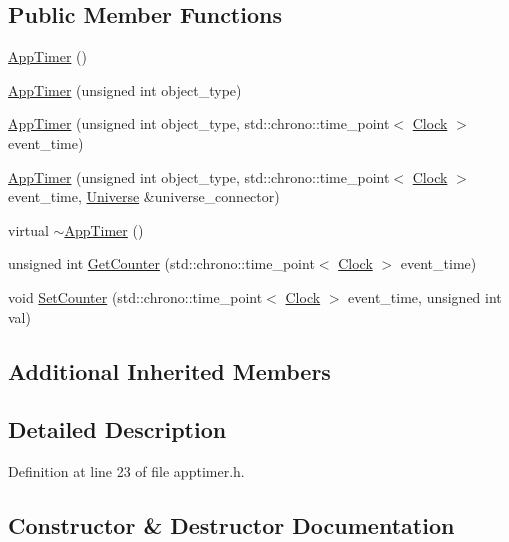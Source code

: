 \subsection*{Public Member Functions}
\begin{DoxyCompactItemize}
\item 
\hyperlink{class_app_timer_a59bf4eccdc9a3e16745b2cf9a122f935}{App\+Timer} ()
\item 
\hyperlink{class_app_timer_a06df15e33135f60f661c231e067951f3}{App\+Timer} (unsigned int object\+\_\+type)
\item 
\hyperlink{class_app_timer_a192075895ca575e9acb2663f3ebcecd6}{App\+Timer} (unsigned int object\+\_\+type, std\+::chrono\+::time\+\_\+point$<$ \hyperlink{universe_8h_a0ef8d951d1ca5ab3cfaf7ab4c7a6fd80}{Clock} $>$ event\+\_\+time)
\item 
\hyperlink{class_app_timer_af0836d131aa78b6812930199a5c7f9bd}{App\+Timer} (unsigned int object\+\_\+type, std\+::chrono\+::time\+\_\+point$<$ \hyperlink{universe_8h_a0ef8d951d1ca5ab3cfaf7ab4c7a6fd80}{Clock} $>$ event\+\_\+time, \hyperlink{class_universe}{Universe} \&universe\+\_\+connector)
\item 
virtual \hyperlink{class_app_timer_a5ef0c072a0591cf5a3bcc07edbd3577f}{$\sim$\+App\+Timer} ()
\item 
unsigned int \hyperlink{class_app_timer_ab9bb2b5f283b02d6d2292e064ddbd2ab}{Get\+Counter} (std\+::chrono\+::time\+\_\+point$<$ \hyperlink{universe_8h_a0ef8d951d1ca5ab3cfaf7ab4c7a6fd80}{Clock} $>$ event\+\_\+time)
\item 
void \hyperlink{class_app_timer_a77d5d447d6b136a35304b0571a166ddc}{Set\+Counter} (std\+::chrono\+::time\+\_\+point$<$ \hyperlink{universe_8h_a0ef8d951d1ca5ab3cfaf7ab4c7a6fd80}{Clock} $>$ event\+\_\+time, unsigned int val)
\end{DoxyCompactItemize}
\subsection*{Additional Inherited Members}


\subsection{Detailed Description}


Definition at line 23 of file apptimer.\+h.



\subsection{Constructor \& Destructor Documentation}
\mbox{\label{class_app_timer_a59bf4eccdc9a3e16745b2cf9a122f935}} 
